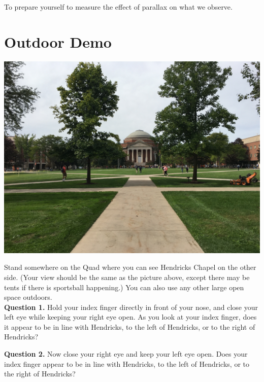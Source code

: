 \documentclass[11pt]{article}
\begin{document}
To prepare yourself to measure the effect of parallax on what we observe.

\newpage

\section{Outdoor Demo}

\begin{center}
	\includegraphics[width=150mm, scale=0.5]{Hall_of_Engineering}
\end{center}
Stand somewhere on the Quad where you can see Hendricks Chapel on the other side. (Your view should be the same as the picture above, except there may be tents if there is sportsball happening.) You can also use any other large open space outdoors.\\ 

\textbf{Question 1.} Hold your index finger directly in front of your nose, and close your left eye while keeping your right eye open. As you look at your index finger, does it appear to be in line with Hendricks, to the left of Hendricks, or to the right of Hendricks?\\

\vspace*{1.5cm}
\hrulefill

\newpage

\textbf{Question 2.} Now close your right eye and keep your left eye open. Does your index finger appear to be in line with Hendricks, to the left of Hendricks, or to the right of Hendricks?\\
\end{document}
